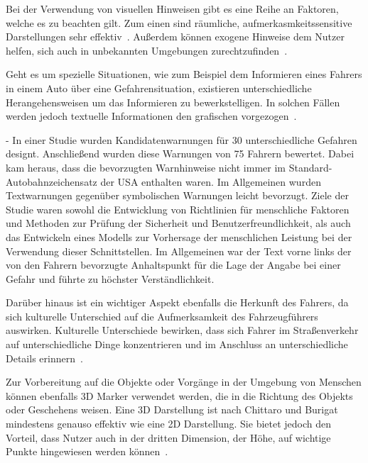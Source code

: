 
Bei der Verwendung von visuellen Hinweisen gibt es eine Reihe an Faktoren, welche es zu beachten gilt. Zum einen sind räumliche, aufmerkasmkeitssensitive Darstellungen sehr effektiv~\cite{bonanni2005attention}. Außerdem können exogene Hinweise dem Nutzer helfen, sich auch in unbekannten Umgebungen zurechtzufinden~\cite{bonanni2005attention}.

Geht es um spezielle Situationen, wie zum Beispiel dem Informieren eines Fahrers in einem Auto über eine Gefahrensituation, existieren unterschiedliche Herangehensweisen um das Informieren zu bewerkstelligen. In solchen Fällen werden jedoch textuelle Informationen den grafischen vorgezogen~\cite{green1995driver}.

-\cite{green1995driver}
In einer Studie wurden Kandidatenwarnungen für 30 unterschiedliche Gefahren designt. Anschließend wurden diese Warnungen von 75 Fahrern bewertet. Dabei kam heraus, dass die bevorzugten Warnhinweise nicht immer im Standard-Autobahnzeichensatz der USA enthalten waren. Im Allgemeinen wurden Textwarnungen gegenüber symbolischen Warnungen leicht bevorzugt. Ziele der Studie waren sowohl die Entwicklung von Richtlinien für menschliche Faktoren und Methoden zur Prüfung der Sicherheit und Benutzerfreundlichkeit, als auch das Entwickeln eines Modells zur Vorhersage der menschlichen Leistung bei der Verwendung dieser Schnittstellen. Im Allgemeinen war der Text vorne links der von den Fahrern bevorzugte Anhaltspunkt für die Lage der Angabe bei einer Gefahr und führte zu höchster Verständlichkeit.

Darüber hinaus ist ein wichtiger Aspekt ebenfalls die Herkunft des Fahrers, da sich kulturelle Unterschied auf die Aufmerksamkeit des Fahrzeugführers auswirken.
Kulturelle Unterschiede bewirken, dass sich Fahrer im Straßenverkehr auf unterschiedliche Dinge konzentrieren und im Anschluss an unterschiedliche Details erinnern~\cite{shinohara2017visual}.

Zur Vorbereitung auf die Objekte oder Vorgänge in der Umgebung von Menschen können ebenfalls 3D Marker verwendet werden, die in die Richtung des Objekts oder Geschehens weisen. Eine 3D Darstellung ist nach Chittaro und Burigat mindestens genauso effektiv wie eine 2D Darstellung. Sie bietet jedoch den Vorteil, dass Nutzer auch in der dritten Dimension, der Höhe, auf wichtige Punkte hingewiesen werden können~\cite{chittaro20043d}.\\
